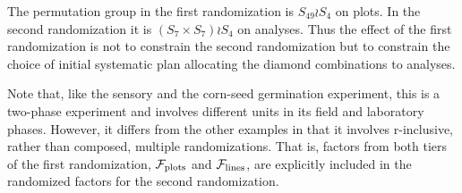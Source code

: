 The permutation group in the first randomization is $S_{49}\wr
S_4$ on plots. In the second randomization it is $(S_7 \times S_7) \wr
S_4$ on analyses. Thus the effect of the first randomization is 
not to constrain the second randomization but to constrain the 
choice of initial systematic plan allocating the diamond combinations
to analyses.

Note that, like the sensory and the corn-seed germination experiment, 
this is 
a two-phase experiment and involves different units in its field and 
laboratory phases. However, it differs from the other examples in that 
it involves r-inclusive, rather than composed, 
multiple randomizations. That is, factors from both tiers of the first 
randomization, ${\cal F}_{\rm plots}$ and ${\cal F}_{\rm lines}$, are 
explicitly included in the randomized factors for the 
second randomization.

